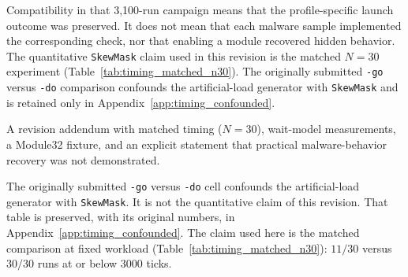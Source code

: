 Compatibility in that 3{,}100-run campaign means that the profile-specific launch outcome was preserved. It does not mean that each malware sample implemented the corresponding check, nor that enabling a module recovered hidden behavior. The quantitative \texttt{SkewMask} claim used in this revision is the matched $N=30$ experiment (Table~\ref{tab:timing_matched_n30}). The originally submitted \texttt{-go} versus \texttt{-do} comparison confounds the artificial-load generator with \texttt{SkewMask} and is retained only in Appendix~\ref{app:timing_confounded}.

\item A revision addendum with matched timing ($N=30$), wait-model measurements, a Module32 fixture, and an explicit statement that practical malware-behavior recovery was not demonstrated.


The originally submitted \texttt{-go} versus \texttt{-do} cell confounds the artificial-load generator with \texttt{SkewMask}. It is not the quantitative claim of this revision. That table is preserved, with its original numbers, in Appendix~\ref{app:timing_confounded}. The claim used here is the matched comparison at fixed workload (Table~\ref{tab:timing_matched_n30}): $11/30$ versus $30/30$ runs at or below $3000$ ticks.

